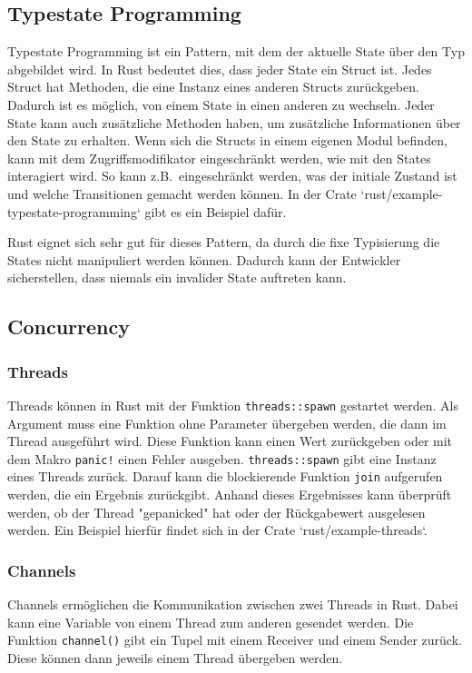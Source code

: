 \documentclass[letterpaper,12pt]{article}
\begin{document}
    \subsection{Typestate Programming}\label{subsec:typestate-programming)}
    Typestate Programming ist ein Pattern, mit dem der aktuelle State über den Typ abgebildet wird.
    In Rust bedeutet dies, dass jeder State ein Struct ist.
    Jedes Struct hat Methoden, die eine Instanz eines anderen Structs zurückgeben.
    Dadurch ist es möglich, von einem State in einen anderen zu wechseln.
    Jeder State kann auch zusätzliche Methoden haben, um zusätzliche Informationen über den State zu erhalten.
    Wenn sich die Structs in einem eigenen Modul befinden, kann mit dem Zugriffsmodifikator eingeschränkt werden, wie mit den States interagiert wird.
    So kann z.B.\ eingeschränkt werden, was der initiale Zustand ist und welche Transitionen gemacht werden können.
    In der Crate `rust/example-typestate-programming` gibt es ein Beispiel dafür.

    Rust eignet sich sehr gut für dieses Pattern, da durch die fixe Typisierung die States nicht manipuliert werden können.
    Dadurch kann der Entwickler sicherstellen, dass niemals ein invalider State auftreten kann.

    \subsection{Concurrency}\label{subsec:concurrency}
    \subsubsection{Threads}\label{subsubsec:threads}
    Threads können in Rust mit der Funktion \texttt{threads::spawn} gestartet werden.
    Als Argument muss eine Funktion ohne Parameter übergeben werden, die dann im Thread ausgeführt wird.
    Diese Funktion kann einen Wert zurückgeben oder mit dem Makro \texttt{panic!} einen Fehler ausgeben.
        \texttt{threads::spawn} gibt eine Instanz eines Threads zurück.
    Darauf kann die blockierende Funktion \texttt{join} aufgerufen werden, die ein Ergebnis zurückgibt.
    Anhand dieses Ergebnisses kann überprüft werden, ob der Thread "gepanicked" hat oder der Rückgabewert ausgelesen werden.
    Ein Beispiel hierfür findet sich in der Crate `rust/example-threads`.

    \subsubsection{Channels}\label{subsubsec:channels}
    Channels ermöglichen die Kommunikation zwischen zwei Threads in Rust.
    Dabei kann eine Variable von einem Thread zum anderen gesendet werden.
    Die Funktion \texttt{channel()} gibt ein Tupel mit einem Receiver und einem Sender zurück.
    Diese können dann jeweils einem Thread übergeben werden.
\end{document}
